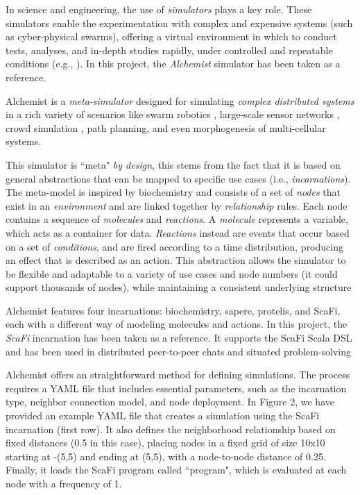 \documentclass[12pt,a4paper,openright,twoside]{book}
\begin{document}
In science and engineering, the use of \emph{simulators} plays a key role. These simulators enable the experimentation 
    with complex and expensive systems (such as cyber-physical swarms), offering a virtual 
    environment in which to conduct tests, analyses, and in-depth studies rapidly, under controlled and 
    repeatable conditions (e.g., \cite{argun2021simulation, bagrodia1998parsec, choi2021use, cannon2009simulation}).
    In this project, the \emph{Alchemist} \cite{alchemist} simulator has been taken as a reference.

Alchemist is a \emph{meta-simulator} designed for simulating \emph{complex distributed systems} in a rich variety of scenarios 
    like swarm robotics \cite{Casadei2021}, large-scale sensor networks \cite{Aguzzi_2022},
    crowd simulation \cite{AC}, path planning, and even morphogenesis of multi-cellular systems.

This simulator is ``meta" \emph{by design}, this stems from the fact that it is based on general abstractions that
    can be mapped to specific use cases (i.e., \emph{incarnations}). The meta-model is inspired by biochemistry
    and consists of a set of \emph{nodes} that exist in an \emph{environment} and are linked together by 
    \emph{relationship} rules.
    Each node contains a sequence of \emph{molecules} and \emph{reactions}. 
    A \emph{molecule} represents a variable, which acts as a container for data. 
    \emph{Reactions} instead are events that occur based on a set of \emph{conditions}, and are fired according 
    to a time distribution, producing an effect that is described as an action. 
    This abstraction allows the simulator to be flexible and adaptable to a variety of use cases and node
    numbers (it could support thousands of nodes), while maintaining a consistent underlying structure

Alchemist features four incarnations: biochemistry, sapere, protelis, and ScaFi, 
    each with a different way of modeling molecules and actions.
    In this project, the \emph{ScaFi} incarnation has been taken as a reference.
    It supports the ScaFi Scala DSL and has been used in distributed peer-to-peer chats and 
    situated problem-solving

Alchemist offers an straightforward method for defining simulations. The process
    requires a YAML file that includes essential parameters, such as the incarnation
    type, neighbor connection model, and node deployment. In Figure 2, we have
    provided an example YAML file that creates a simulation using the ScaFi incarnation (first row). It also defines the neighborhood relationship based on fixed
    distances (0.5 in this case), placing nodes in a fixed grid of size 10x10 starting
    at -(5,5) and ending at (5,5), with a node-to-node distance of 0.25. Finally, it
    loads the ScaFi program called ``program", which is evaluated at each node with
    a frequency of 1.
\end{document}
